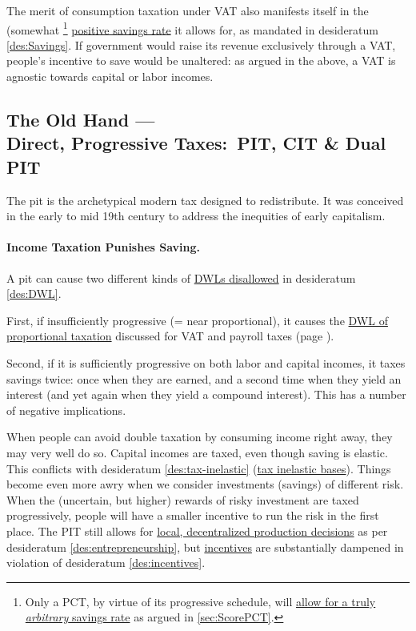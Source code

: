 The merit of consumption taxation under VAT also manifests itself in the (somewhat
\footnote{
	Only a PCT, by virtue of its progressive schedule, will \hyperref[sec:ScorePCT]{allow for a truly \emph{arbitrary} savings rate} as argued in \autoref{sec:ScorePCT}.
}
\hyperref[des:Savings]{positive savings rate} it allows for, as mandated in desideratum \ref{des:Savings}.
If government would raise its revenue exclusively through a VAT, people's incentive to save would be unaltered:
as argued in the above, a VAT is agnostic towards capital or labor incomes.

\subsection[Direct, Progressive Taxes]{The Old Hand ---\\Direct, Progressive Taxes:~PIT, CIT \& Dual PIT}
	\label{sec:ScorePIT}
The \gls{pit} is the archetypical modern tax designed to redistribute.
It was conceived in the early to mid 19th century to address the inequities of early capitalism.

\paragraph{Income Taxation Punishes Saving.}
A \gls{pit} can cause two different kinds of \hyperref[des:DWL]{DWLs disallowed} in desideratum \ref{des:DWL}.

First, if insufficiently progressive (= near proportional), it causes the \hyperref[sec:PropTaxDWL]{DWL of proportional taxation} discussed for VAT and payroll taxes (page \pageref{sec:PropTaxDWL}).

Second, if it is sufficiently progressive on both labor and capital incomes, it taxes savings twice:
once when they are earned, and a second time when they yield an interest (and yet again when they yield a compound interest).
This has a number of negative implications.

When people can avoid double taxation by consuming income right away, they may very well do so.
Capital incomes are taxed, even though saving is elastic.
This conflicts with desideratum \ref{des:tax-inelastic} (\hyperref[des:tax-inelastic]{tax inelastic bases}).
Things become even more awry when we consider investments (savings) of different risk.
When the (uncertain, but higher) rewards of risky investment are taxed progressively, people will have a smaller incentive to run the risk in the first place.
The PIT still allows for \hyperref[des:entrepreneurship]{local, decentralized production decisions} as per desideratum \ref{des:entrepreneurship}, but \hyperref[des:incentives]{incentives} are substantially dampened in violation of desideratum \ref{des:incentives}.

